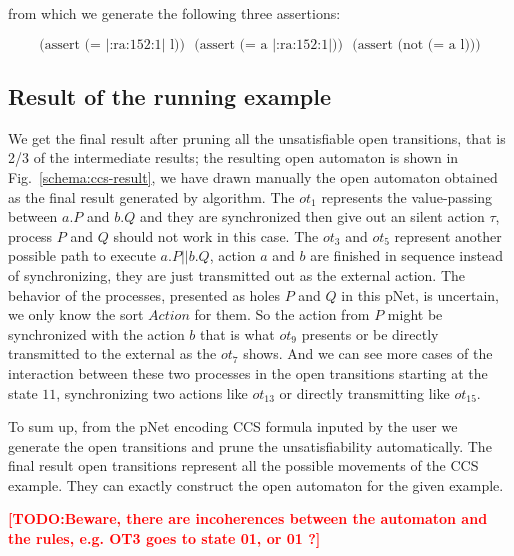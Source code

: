 \documentclass{lncs/llncs}
\newcommand{\TODO}[1]{\textcolor{red}{\textbf{[TODO:#1]}}}
\begin{document}
from which we generate the following three assertions:

\[\text{(assert\ (=\ |:ra:152:1|\ l))}\ \ \ \text{(assert\ (=\ a\ |:ra:152:1|))}\ \ \ \text{(assert\ (not\ (=\ a\ l)))}\]

\subsection{Result of the running example}
\label{section:full-result}

We get the final result after pruning all the unsatisfiable open
transitions, that is 2/3 of the intermediate results; the resulting open
automaton is shown in Fig.~\ref{schema:ccs-result}, we have drawn
manually the open automaton obtained as the final result generated by
algorithm.
The $ot_1$ represents the
value-passing between $a.P$ and $b.Q$ and they are synchronized then
give out an silent action $\tau$, process $P$ and $Q$ should not work
in this case. The $ot_3$ and $ot_5$ represent another possible path to
execute $a.P||b.Q$, action $a$ and $b$ are finished in sequence
instead of synchronizing, they are just transmitted out as the
external action. The behavior of the processes, presented as holes $P$
and $Q$ in this pNet, is uncertain, we only know the sort $Action$ for
them. So the action from $P$ might be synchronized with the action $b$
that is what $ot_9$ presents or be directly transmitted to the
external as the $ot_7$ shows. And we can see more cases of the
interaction between these two processes in the open transitions starting at
the state $11$, synchronizing two actions like $ot_{13}$ or directly
transmitting like $ot_{15}$. 

To sum up, from the pNet encoding CCS formula inputed by the user we
generate the open transitions and prune the unsatisfiability
automatically. The final result open transitions represent all the
possible movements of the CCS example. They can exactly construct the
open automaton for the given example.


\TODO{Beware, there are incoherences between the automaton and the
  rules, e.g. OT3 goes to state 01, or 01 ?}
\end{document}
